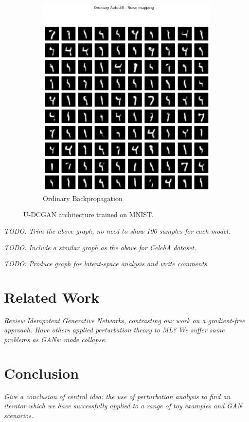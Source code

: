 \documentclass{article}
\begin{document}
\begin{figure}[H]
\begin{subfigure}{.5\textwidth}
    \includegraphics[width=0.9\linewidth]{./resources/mnist-ord-autodiff-generative.png}
    \caption{Ordinary Backpropagation}
  \end{subfigure}
  \caption{U-DCGAN architecture trained on MNIST.}
  \label{fig:test}
\end{figure}

\textit{TODO: Trim the above graph, no need to show 100 samples for each model.}

\textit{TODO: Include a similar graph as the above for CelebA dataset.}

\textit{TODO: Produce graph for latent-space analysis and write comments.}


\section{Related Work}
\label{sec:related}
\textit{Review Idempotent Generative Networks, contrasting our work on a gradient-free approach. Have others applied perturbation theory to ML? We suffer same problems as GANs: mode collapse.}

\section{Conclusion}
\label{sec:conclusion}
\textit{Give a conclusion of central idea: the use of perturbation analysis to find an iterator which we have successfully applied to a range of toy examples and GAN scenarios.}
\end{document}
